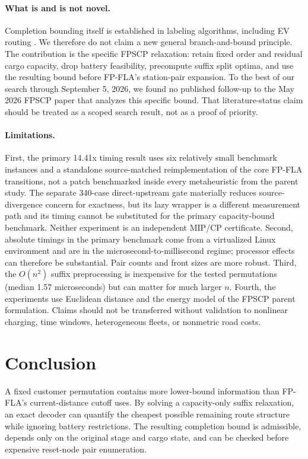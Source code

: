 \documentclass[11pt]{article}
\begin{document}
\paragraph{What is and is not novel.} Completion bounding itself is established in labeling algorithms, including EV routing \cite{froger2019,enerback2024}. We therefore do not claim a new general branch-and-bound principle. The contribution is the specific FPSCP relaxation: retain fixed order and residual cargo capacity, drop battery feasibility, precompute suffix split optima, and use the resulting bound before FP-FLA's station-pair expansion. To the best of our search through September 5, 2026, we found no published follow-up to the May 2026 FPSCP paper that analyzes this specific bound. That literature-status claim should be treated as a scoped search result, not as a proof of priority.

\paragraph{Limitations.} First, the primary 14.41x timing result uses six relatively small benchmark instances and a standalone source-matched reimplementation of the core FP-FLA transitions, not a patch benchmarked inside every metaheuristic from the parent study. The separate 340-case direct-upstream gate materially reduces source-divergence concern for exactness, but its lazy wrapper is a different measurement path and its timing cannot be substituted for the primary capacity-bound benchmark. Neither experiment is an independent MIP/CP certificate. Second, absolute timings in the primary benchmark come from a virtualized Linux environment and are in the microsecond-to-millisecond regime; processor effects can therefore be substantial. Pair counts and front sizes are more robust. Third, the $O(n^2)$ suffix preprocessing is inexpensive for the tested permutations (median 1.57 microseconds) but can matter for much larger $n$. Fourth, the experiments use Euclidean distance and the energy model of the FPSCP parent formulation. Claims should not be transferred without validation to nonlinear charging, time windows, heterogeneous fleets, or nonmetric road costs.

\section{Conclusion}
A fixed customer permutation contains more lower-bound information than FP-FLA's current-distance cutoff uses. By solving a capacity-only suffix relaxation, an exact decoder can quantify the cheapest possible remaining route structure while ignoring battery restrictions. The resulting completion bound is admissible, depends only on the original stage and cargo state, and can be checked before expensive reset-node pair enumeration.
\end{document}
